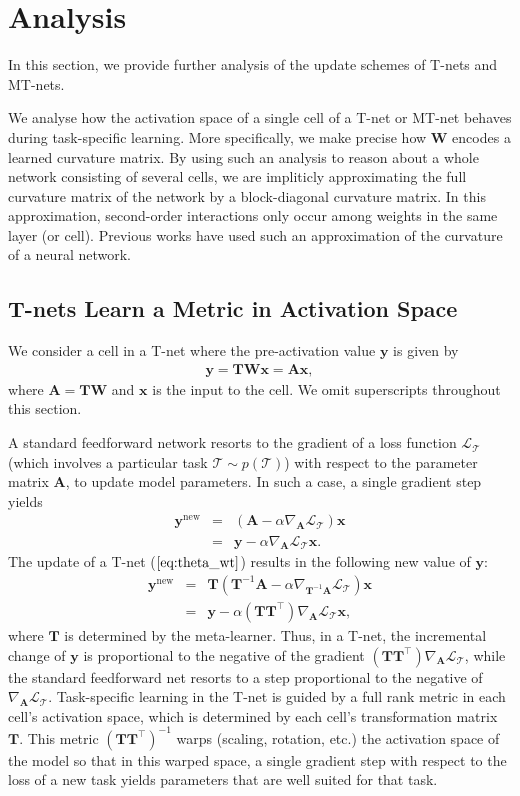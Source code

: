 \documentclass{article}
\newcommand{\calT}{{\mathcal{T}}}
\newcommand{\0}{{\bf 0}}
\newcommand{\be}{\begin{eqnarray}}
\newcommand{\ee}{\end{eqnarray}}
\newcommand{\x}{\mathbf{x}}
\newcommand{\y}{\mathbf{y}}
\newcommand{\A}{\mathbf{A}}
\newcommand{\W}{\mathbf{W}}
\newcommand{\T}{\mathbf{T}}
\newcommand{\loss}{\mathcal{L}_{\calT}}
\begin{document}
\section{Analysis}
\label{sec:analysis}

In this section, we provide further analysis of the update schemes of T-nets and MT-nets.

We analyse how the activation space of a single cell of a T-net or MT-net behaves during task-specific learning.
More specifically, we make precise how $\W$ encodes a learned curvature matrix.
By using such an analysis to reason about a whole network consisting of several cells, 
we are impliticly approximating the full curvature matrix of the network by
a block-diagonal curvature matrix.
In this approximation, second-order interactions only occur among weights in the same layer (or cell).
Previous works \cite{Heskes2000neuralcomp,Martens2015icml,Desjardins2015nips} have used such an approximation of the curvature of a neural network.

\subsection{T-nets Learn a Metric in Activation Space}
\label{subsec:tnet_analysis}

We consider a cell in a T-net where the pre-activation value $\y$ is given by
\be
\y = \T \W \x = \A \x,
\ee
where $\A=\T \W$ and $\x$ is the input to the cell. 
We omit superscripts throughout this section.

A standard feedforward network resorts to the gradient of a loss function $\loss$ 
(which involves a particular task $\calT \sim p(\calT)$) with respect to the parameter matrix $\A$,
to update model parameters.
In such a case, a single gradient step yields
\be
\y^\text{new} &=& (\A - \alpha \nabla_{\A} \loss) \x  \nonumber \\
&=& \y - \alpha \nabla_{\A} \loss \x.
\ee
The update of a T-net ($\ref{eq:theta_wt}$) results in the following new value of $\y$:
\be
\label{eq:tnet_update}
\y^\text{new} &=& \T \left(\T^{-1} \A - \alpha \nabla_{\T^{-1} \A} \loss \right) \x  \nonumber \\
&=& \y - \alpha  \left( \T \T^{\top} \right) \nabla_{\A} \loss \x,
\ee
where $\T$ is determined by the meta-learner.
Thus, in a T-net, the incremental change of $\y$ is proportional to the negative of the gradient 
$\left( \T  \T^{\top}\right) \nabla_{\A} \loss$, while the standard feedforward net resorts to a step proportional to 
the negative of $ \nabla_{\A} \loss$.
Task-specific learning in the T-net is guided by a full rank metric in each cell's activation space,
which is determined by each cell's transformation matrix $\T$.
This metric $(\T \T^{\top})^{-1}$ warps (scaling, rotation, etc.) the activation space of the model so that in this warped space,
a single gradient step with respect to the loss of a new task yields parameters that are well suited for that task.
\end{document}

